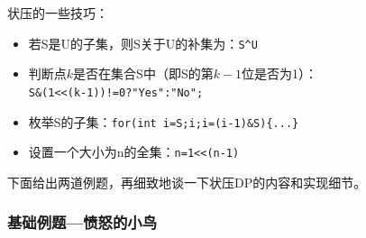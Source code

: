 \documentclass{article}
\theoremstyle{nonumberplain}
\begin{document}
状压的一些技巧：
\begin{itemize}
	\item{若S是U的子集，则S关于U的补集为：\verb$S^U$}
	\item{判断点$k$是否在集合S中（即S的第$k- 1$位是否为1）：\\\verb$S&(1<<(k-1))!=0?"Yes":"No";$}
	\item{枚举S的子集：\verb$for(int i=S;i;i=(i-1)&S){...}$}
	\item{设置一个大小为n的全集：\verb$n=1<<(n-1)$}
\end{itemize}

下面给出两道例题，再细致地谈一下状压DP的内容和实现细节。

\subsubsection{基础例题---愤怒的小鸟}
\end{document}
